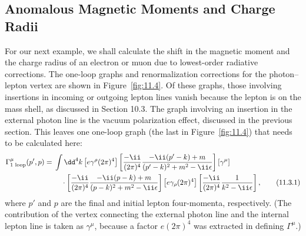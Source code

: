 
\clearpage


\subsection{Anomalous Magnetic Moments and Charge Radii}

For our next example, we shall calculate the shift in the magnetic moment
and the charge radius of an electron or muon due to lowest-order radiative
corrections. The one-loop graphs and renormalization corrections for the
photon--lepton vertex are shown in Figure~\ref{fig:11.4}. Of these graphs, those
involving insertions in incoming or outgoing lepton lines vanish because the
lepton is on the mass shell, as discussed in Section 10.3. The graph involving
an insertion in the external photon line is the vacuum polarization effect,
discussed in the previous section. This leaves one one-loop graph (the last in
Figure~\ref{fig:11.4}) that needs to be calculated here:
\begin{align}
\Gamma^\mu_{\text{1 loop}}(p',p)={}&\int \dd^4k
 \left[e\gamma^\rho(2\pi)^4\right]
 \left[{ -\ii\over(2\pi)^4}
 { -\ii(\sl{p}'-\sl{k})+m\over(p'-k)^2+m^2-\ii\epsilon}\right]
 \left[\gamma^\mu\right]\notag\\
&\quad\cdot
 \left[{ -\ii\over(2\pi)^4}
 { -\ii(\sl{p}-\sl{k})+m\over(p-k)^2+m^2-\ii\epsilon}\right]
 \left[e\gamma_\rho(2\pi)^4\right]
 \left[{ -\ii\over(2\pi)^4}{1\over k^2-\ii\epsilon}\right],
\tag{11.3.1}\label{eq:11.3.1}
\end{align}
where $p'$ and $p$ are the final and initial lepton four-momenta,
respectively. (The contribution of the vertex connecting the external photon
line and the internal lepton line is taken as $\gamma^\mu$, because a factor
$e(2\pi)^4$ was extracted in defining $\Gamma^\mu$.)

